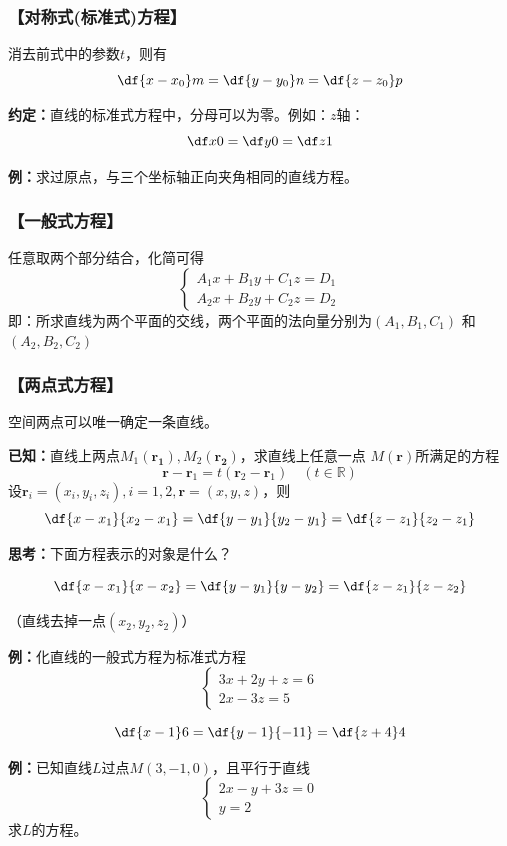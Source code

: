 \subsubsection{【对称式(标准式)方程】}

消去前式中的参数$t$，则有
$$
	{\df{x-x_0}m=\df{y-y_0}n=\df{z-z_0}p}
$$

{\bf 约定：}直线的标准式方程中，分母可以为零。例如：$z$轴：
$$\df x0=\df y0=\df z1$$

{\bf 例：}求过原点，与三个坐标轴正向夹角相同的直线方程。

\subsubsection{【一般式方程】}

任意取两个部分结合，化简可得
$$
	\left\{\begin{array}{l}
		A_1x+B_1y+C_1z=D_1\\
		A_2x+B_2y+C_2z=D_2
	\end{array}\right.
$$
即：所求直线为两个平面的交线，两个平面的法向量分别为$(A_1,B_1,C_1)$
和$(A_2,B_2,C_2)$

\subsubsection{【两点式方程】}

空间两点可以唯一确定一条直线。

{\bf 已知：}直线上两点$M_1(\bm{r_1}),M_2(\bm{r_2})$，求直线上任意一点
$M(\bm{r})$所满足的方程
$${\bm{r}-\bm{r}_1=t(\bm{r}_2-\bm{r}_1)\quad (t\in\mathbb{R})}$$ 
设$\bm{r}_i=(x_i,y_i,z_i),i=1,2,\bm{r}=(x,y,z)$，则
$${\df{x-x_1}{x_2-x_1}=\df{y-y_1}{y_2-y_1}=\df{z-z_1}{z_2-z_1}}$$

{\bf 思考：}下面方程表示的对象是什么？

$${\df{x-x_1}{x-x_2}=\df{y-y_1}{y-y_2}=\df{z-z_1}{z-z_2}}$$

\hfill （直线去掉一点$(x_2,y_2,z_2)$）

{\bf 例：}化直线的一般式方程为标准式方程
$$\left\{\begin{array}{l}
	3x+2y+z=6\\
	2x-3z=5
\end{array}\right.$$

$$\df{x-1}6=\df{y-1}{-11}=\df{z+4}4$$

{\bf 例：}已知直线$L$过点$M(3,-1,0)$，且平行于直线
$$\left\{\begin{array}{l}
	2x-y+3z=0\\
	y=2
\end{array}\right.$$
求$L$的方程。

